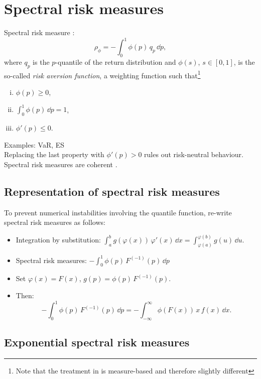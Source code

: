 \documentclass[square]{article} %
\theoremstyle{plain}
\theoremstyle{definition} %
\begin{document}
\section{Spectral risk measures}
\label{sec:spectr-risk-meas}

Spectral risk measure \citep{Acerbi2002,Cotter2006}:
\begin{equation*}
\rho_\phi = -\int_0^1 \phi(p)\, q_p\, \dd p,
\end{equation*}
where $q_p$ is the $p$-quantile of the return distribution and
$\phi(s)$, $s\in [0,1]$, is the so-called {\em risk aversion
  function\/}, a weighting function such that\footnote{Note that the
  treatment in \citep{Acerbi2002} is measure-based and therefore
  slightly different} 
\begin{enumerate}[(i)]
\item $\phi(p)\geq 0$,
\item $\int_0^1\phi(p)\, \dd p=1$,
\item $\phi'(p)\leq 0$. 
\end{enumerate}
Examples: VaR, ES\\
Replacing the last property with $\phi'(p)>0$ rules out risk-neutral
behaviour. \\
Spectral risk measures are coherent \citep{Acerbi2002}. 

\subsection{Representation of spectral risk measures}
\label{sec:repr-spectr-risk}

To prevent numerical instabilities involving the quantile function,
re-write spectral risk measures as follows:
\begin{itemize}
\item Integration by substitution: $\displaystyle \int_a^b
  g(\varphi(x)) \,\varphi'(x)\, \dd x = \int_{\varphi(a)}^{\varphi(b)}
  g(u)\, \dd u$.
\item Spectral risk measures: $\displaystyle -\int_0^1 \phi(p) \,
  F^{(-1)}(p)\, \dd p$
\item Set $\varphi(x)=F(x)$, $g(p) = \phi(p)\, F^{(-1)}(p)$.
\item Then:
  \begin{equation*}
    -\int_0^1 \phi(p)\, F^{(-1)}(p)\, \dd p = -\int_{-\infty}^\infty
    \phi(F(x))\, x\, f(x)\, \dd x.
  \end{equation*}
\end{itemize}


\subsection{Exponential spectral risk measures}
\label{sec:expon-risk-meas}
\end{document}
